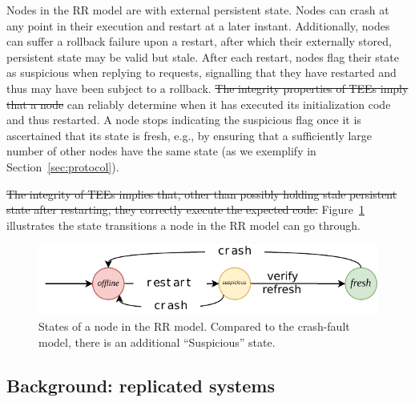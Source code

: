 Nodes in the \ac{RR} model are  with external
persistent state. Nodes can crash at any point in their execution
and restart at a later instant.  Additionally, nodes can suffer a
rollback failure upon a restart, after which their externally
stored, persistent state may be valid but stale.  After each
restart, nodes flag their state as suspicious when replying to
requests, signalling that they have restarted and thus may have
been subject to a rollback.  \sout{The integrity properties of \acp{TEE}
imply that a node} can reliably determine when it has executed its
initialization code and thus restarted. A node stops indicating
the suspicious flag once it is ascertained that its state is
fresh, e.g., by ensuring that a sufficiently large number of
other nodes have the same state (as we exemplify in
Section~\ref{sec:protocol}).

\sout{The
integrity of \acp{TEE} implies that, other than possibly holding stale
persistent state after restarting, they correctly execute the
expected code.} Figure~\ref{fig:states} illustrates the state
transitions a node in the \ac{RR} model can go through.

\begin{figure}[t]
    \centering
    \includegraphics[width=\linewidth]{img/RR_states}
    \caption{States of a node in the \ac{RR} model. Compared
      to the crash-fault model, there is an additional ``Suspicious''
      state.}\label{fig:states}
\end{figure}

\subsection{Background: replicated systems}\label{ssec:sys_model}

